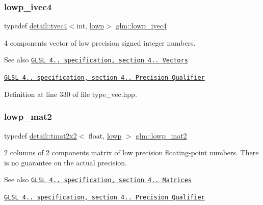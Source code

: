 \subsubsection{\texorpdfstring{lowp\+\_\+ivec4}{lowp\_ivec4}}
{\footnotesize\ttfamily typedef \hyperlink{structglm_1_1detail_1_1tvec4}{detail\+::tvec4}$<$int, \hyperlink{namespaceglm_a0f04f086094c747d227af4425893f545ae161af3fc695e696ce3bf69f7332bc2d}{lowp}$>$ \hyperlink{group__core__precision_gab9b404ae623385d5094499d2d4e4616d}{glm\+::lowp\+\_\+ivec4}}

4 components vector of low precision signed integer numbers.

\begin{DoxySeeAlso}{See also}
\href{http://www.opengl.org/registry/doc/GLSLangSpec.4.20.8.pdf}{\tt G\+L\+SL 4.. specification, section 4.. Vectors} 

\href{http://www.opengl.org/registry/doc/GLSLangSpec.4.20.8.pdf}{\tt G\+L\+SL 4.. specification, section 4.. Precision Qualifier} 
\end{DoxySeeAlso}


Definition at line 330 of file type\+\_\+vec.\+hpp.

\mbox{\label{group__core__precision_gac0acc3ccf8da050af3393ea639f698d6}} 
\subsubsection{\texorpdfstring{lowp\+\_\+mat2}{lowp\_mat2}}
{\footnotesize\ttfamily typedef \hyperlink{structglm_1_1detail_1_1tmat2x2}{detail\+::tmat2x2}$<$ float, \hyperlink{namespaceglm_a0f04f086094c747d227af4425893f545ae161af3fc695e696ce3bf69f7332bc2d}{lowp} $>$ \hyperlink{group__core__precision_gac0acc3ccf8da050af3393ea639f698d6}{glm\+::lowp\+\_\+mat2}}

2 columns of 2 components matrix of low precision floating-\/point numbers. There is no guarantee on the actual precision.

\begin{DoxySeeAlso}{See also}
\href{http://www.opengl.org/registry/doc/GLSLangSpec.4.20.8.pdf}{\tt G\+L\+SL 4.. specification, section 4.. Matrices} 

\href{http://www.opengl.org/registry/doc/GLSLangSpec.4.20.8.pdf}{\tt G\+L\+SL 4.. specification, section 4.. Precision Qualifier} 
\end{DoxySeeAlso}



